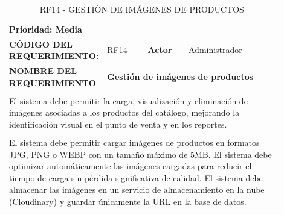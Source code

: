 \begingroup
\renewcommand{\arraystretch}{1.3}
\setlength{\tabcolsep}{6pt}
\centering
\begin{longtable}{|p{0.25\linewidth}|p{0.15\linewidth}|p{0.15\linewidth}|p{0.35\linewidth}|}
\caption{RF14 - GESTIÓN DE IMÁGENES DE PRODUCTOS}\label{tab:rf14}\\
\hline
		\rowcolor{tableheaderblue}
		\multicolumn{4}{|l|}{\textbf{Requerimientos funcionales}}                                                                                                                                      \\ \hline
		\multicolumn{4}{|l|}{\textbf{Prioridad: Media}}                                                                                                                                                \\ \hline
		\textbf{CÓDIGO DEL REQUERIMIENTO:}                          & RF14                                                           & \cellcolor{tableheaderblue}\textbf{Actor} & Administrador       \\ \hline
		\textbf{NOMBRE DEL REQUERIMIENTO}                           & \multicolumn{3}{l|}{\textbf{Gestión de imágenes de productos}}                                                                   \\ \hline
		\rowcolor{tableheaderblue}
		\multicolumn{4}{|l|}{\textbf{Descripción}}                                                                                                                                                     \\ \hline
		\multicolumn{4}{|p{0.96\linewidth}|}{%
		El sistema debe permitir la carga, visualización y eliminación de imágenes asociadas a los productos del catálogo, mejorando la identificación visual en el punto de venta y en los reportes.} \\ \hline
		\rowcolor{tableheaderblue}
		\multicolumn{4}{|l|}{\textbf{Funcionalidad}}                                                                                                                                                   \\ \hline
		\multicolumn{4}{|p{0.96\linewidth}|}{%
		El sistema debe permitir cargar imágenes de productos en formatos JPG, PNG o WEBP con un tamaño máximo de 5MB. \newline
		El sistema debe optimizar automáticamente las imágenes cargadas para reducir el tiempo de carga sin pérdida significativa de calidad. \newline
		El sistema debe almacenar las imágenes en un servicio de almacenamiento en la nube (Cloudinary) y guardar únicamente la URL en la base de datos. \newline
}
\end{longtable}
